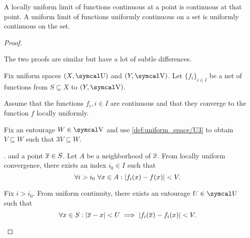 \begin{proposition}\label{def:uniform_limit_of_continuous_functions}
  \mbox{}
  \begin{thmenum}
     A locally uniform limit of functions continuous at a point is continuous at that point.
     A uniform limit of functions uniformly continuous on a set is uniformly continuous on the set.
  \end{thmenum}
\end{proposition}
\begin{proof}
  \begin{description}
    The two proofs are similar but have a lot of subtle differences.

    Fix uniform spaces \( (X, \CU) \) and \( (Y, \CV) \). Let \( \{ f_i \}_{i \in I} \) be a net of functions from \( S \subseteq X \) to \( (Y, \CV) \).

    \begin{description}
       Assume that the functions \( f_i, i \in I \) are continuous and that they converge to the function \( f \) locally uniformly.

      Fix an entourage \( W \in \CV \) and use \cref{def:uniform_space/U3} to obtain \( V \subseteq W \) such that \( 3V \subseteq W \).

      . and a point \( \overline{x} \in S \). Let \( A \) be a neighborhood of \( \overline{x} \). From locally uniform convergence, there exists an index \( i_0 \in I \) such that
      \begin{equation*}
        \forall i > i_0 \ \forall x \in A : \left\vert f_i(x) - f(x) \right\vert < V.
      \end{equation*}

      Fix \( i > i_0 \). From uniform continuity, there exists an entourage \( U \in \CU \) such that
      \begin{equation*}
        \forall x \in S : \left\vert \overline{x} - x \right\vert < U \implies \left\vert f_i(\overline{x}) - f_i(x) \right\vert < V.
      \end{equation*}


\end{description}
\end{description}
\end{proof}
